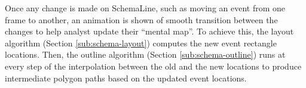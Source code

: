 Once any change is made on SchemaLine, such as moving an event from one frame to another, an animation is shown of smooth transition between the changes to help analyst update their ``mental map''. To achieve this, the layout algorithm (Section \ref{sub:schema-layout}) computes the new event rectangle locations. Then, the outline algorithm (Section \ref{sub:schema-outline}) runs at every step of the interpolation between the old and the new locations to produce intermediate polygon paths based on the updated event locations.